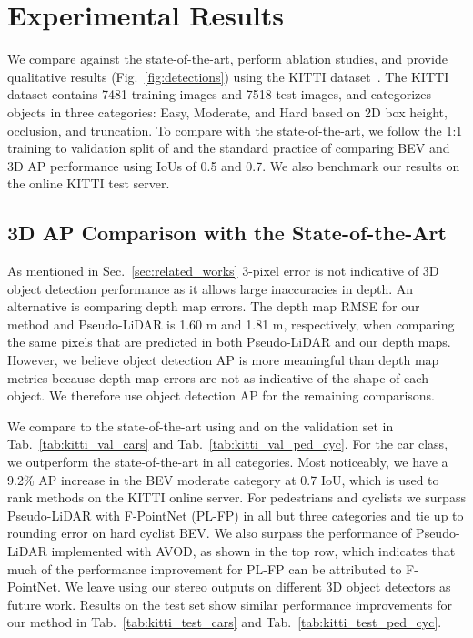\documentclass[letterpaper, 10 pt, conference]{ieeeconf}
\begin{document}
\section{Experimental Results}
\label{sec:result}

We compare against the state-of-the-art, perform ablation studies, and provide qualitative results (Fig.~\ref{fig:detections}) using the KITTI dataset~\cite{geiger_kitti}. The KITTI dataset contains 7481 training images and 7518 test images, and categorizes objects in three categories: Easy, Moderate, and Hard based on 2D box height, occlusion, and truncation. To compare with the state-of-the-art, we follow the 1:1 training to validation split of \cite{chen_mv3d, ku_avod, qi_fpointnet} and the standard practice of comparing BEV and 3D AP performance using IoUs of 0.5 and 0.7. We also benchmark our results on the online KITTI test server.

\subsection{3D AP Comparison with the State-of-the-Art}
As mentioned in Sec.~\ref{sec:related_works} 3-pixel error is not indicative of 3D object detection performance as it allows large inaccuracies in depth. An alternative is comparing depth map errors. The depth map RMSE for our method and Pseudo-LiDAR is 1.60 m and 1.81 m, respectively, when comparing the same pixels that are predicted in both Pseudo-LiDAR and our depth maps. However, we believe object detection AP is more meaningful than depth map metrics because depth map errors are not as indicative of the shape of each object. We therefore use object detection AP for the remaining comparisons.

We compare to the state-of-the-art using  and  on the validation set in 
Tab.~\ref{tab:kitti_val_cars} and Tab.~\ref{tab:kitti_val_ped_cyc}. For the car class, we outperform the state-of-the-art in all categories. Most noticeably, we have a 9.2\% AP increase in the BEV moderate category at 0.7 IoU, which is used to rank methods on the KITTI online server. For pedestrians and cyclists we surpass Pseudo-LiDAR with F-PointNet (PL-FP) in all but three categories and tie up to rounding error on hard cyclist BEV. We also surpass the performance of Pseudo-LiDAR implemented with AVOD, as shown in the top row, which indicates that much of the performance improvement for PL-FP can be attributed to F-PointNet. We leave using our stereo outputs on different 3D object detectors as future work. Results on the test set show similar performance improvements for our method in Tab.~\ref{tab:kitti_test_cars} and Tab.~\ref{tab:kitti_test_ped_cyc}.
\end{document}
